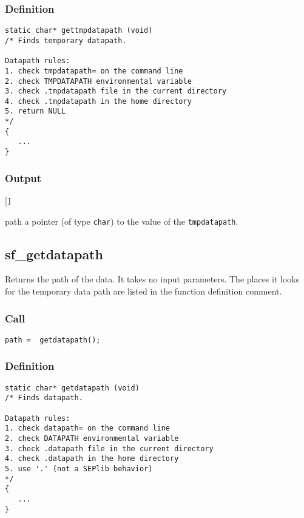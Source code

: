 \subsubsection*{Definition}
\begin{verbatim}
static char* gettmpdatapath (void) 
/* Finds temporary datapath.

Datapath rules:
1. check tmpdatapath= on the command line
2. check TMPDATAPATH environmental variable
3. check .tmpdatapath file in the current directory
4. check .tmpdatapath in the home directory
5. return NULL
*/
{
   ...
}
\end{verbatim}

\subsubsection*{Output}
\begin{desclist}{\tt }{\quad}[\tt ]
   \setlength\itemsep{0pt}
   \item[path] a pointer (of type \texttt{char}) to the value of the \texttt{tmpdatapath}.
\end{desclist}




\subsection{{sf\_getdatapath}}
Returns the path of the data. It takes no input parameters. The places it looks for the temporary data path are listed in the function definition comment.

\subsubsection*{Call}
\begin{verbatim}path =  getdatapath();\end{verbatim}

\subsubsection*{Definition}
\begin{verbatim}
static char* getdatapath (void) 
/* Finds datapath.

Datapath rules:
1. check datapath= on the command line
2. check DATAPATH environmental variable
3. check .datapath file in the current directory
4. check .datapath in the home directory
5. use '.' (not a SEPlib behavior)
*/
{
   ...
}
\end{verbatim}

